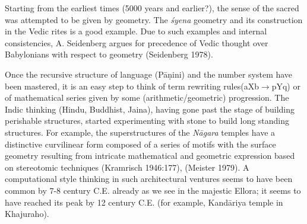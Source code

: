 Starting from the earliest times (5000 years and earlier?), the sense of the sacred was attempted to be given by geometry. The \textsl{śyena} geometry and its construction in the Vedic rites is a good example. Due to such examples and internal consistencies, A. Seidenberg argues for precedence of Vedic thought over Babylonians with respect to geometry (Seidenberg 1978).

Once the recursive structure of language (Pāṇini) and the number system have been mastered, it is an easy step to think of term rewriting rules\break (aXb$\to$pYq) or of mathematical series given by some (arithmetic/geo\-metric) progression. The Indic thinking (Hindu, Buddhist, Jaina), having gone past the stage of building perishable structures, started experimenting with stone to build long standing structures. For example, the superstructures of the \textsl{Nāgara} temples have a distinctive curvilinear form composed of a series of motifs with the surface geometry resulting from intricate mathematical and geometric expression based on stereotomic techniques (Kramrisch 1946:177), (Meister 1979).  A computational style thinking in such architectural ventures seems to have been common by 7-8 century C.E. already as we see in the majestic Ellora; it seems to have reached its peak by 12 century C.E. (for example, Kandāriya temple in Khajuraho).

